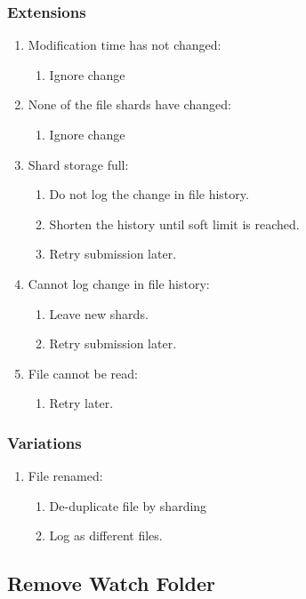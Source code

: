 \documentclass[11pt, a4paper, twoside]{report}
\begin{document}
\subsubsection{Extensions}
\begin{enumerate}
  \item Modification time has not changed:
	\begin{enumerate}
	  \item Ignore change
	\end{enumerate}
  \item None of the file shards have changed:
	\begin{enumerate}
	  \item Ignore change
	\end{enumerate}
  \item Shard storage full:
	\begin{enumerate}
	  \item Do not log the change in file history.
	  \item Shorten the history until soft limit is reached.
	  \item Retry submission later.
	\end{enumerate}
  \item Cannot log change in file history:
	\begin{enumerate}
	  \item Leave new shards.
	  \item Retry submission later.
	\end{enumerate}
  \item File cannot be read:
	\begin{enumerate}
	  \item Retry later.
	\end{enumerate}
\end{enumerate}

\subsubsection{Variations}
\begin{enumerate}
  \item File renamed:
	\begin{enumerate}
	  \item De-duplicate file by sharding
	  \item Log as different files.
	\end{enumerate}
\end{enumerate}

\subsection{Remove Watch Folder}
\end{document}
